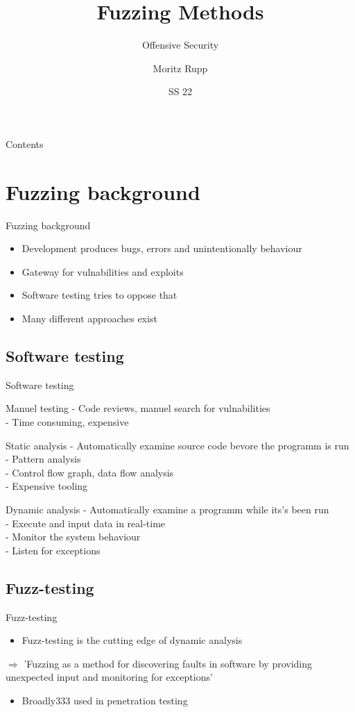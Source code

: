 \documentclass{beamer}
\title[Offensive Security]{Fuzzing Methods}
\subtitle{Offensive Security}
\author{Moritz Rupp}
\institute[MR]{Hochschule Albstadt-Sigmaringen}
\date{SS 22}
\begin{document}
\begin{frame}
 \titlepage
\end{frame}
\begin{frame}{Contents}
 \tableofcontents
\end{frame}
\section{Fuzzing background}
\begin{frame}{Fuzzing background}
\begin{itemize}
 \item Development produces bugs, errors and unintentionally behaviour
 \item Gateway for vulnabilities and exploits
 \item Software testing tries to oppose that
 \item Many different approaches exist
\end{itemize}
\end{frame}
\subsection{Software testing}
\begin{frame}{Software testing}
 \begin{block}{Manuel testing}
  - Code reviews, manuel search for vulnabilities\\
  - Time consuming, expensive
 \end{block}
\begin{block}{Static analysis}
- Automatically examine source code bevore the programm is run\\
- Pattern analysis \\
- Control flow graph, data flow analysis\\
- Expensive tooling
\end{block}
\begin{block}{Dynamic analysis}
- Automatically examine a programm while its's been run\\
- Execute and input data in real-time\\
- Monitor the system behaviour\\
- Listen for exceptions
\end{block}
\end{frame}
\subsection{Fuzz-testing}
\begin{frame}{Fuzz-testing}
\begin{itemize}
  \item Fuzz-testing is the cutting edge of dynamic analysis
 \end{itemize}
$\Rightarrow$ 'Fuzzing as a method for discovering faults in software by providing unexpected input and monitoring for exceptions'
\begin{itemize}
 \item Broadly333 used in penetration testing
\end{itemize}


\end{frame}
\end{document}
